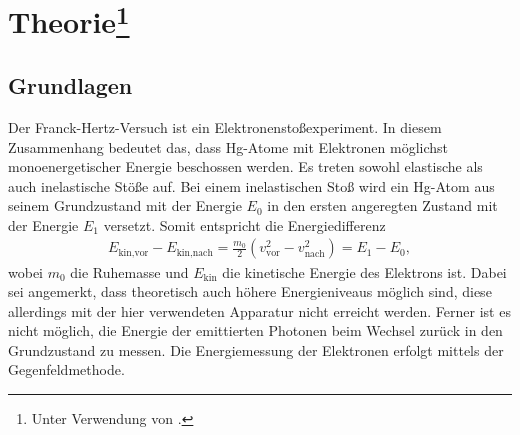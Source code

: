 \section[Theorie]{{Theorie\footnote[1]
{Unter Verwendung von \cite{man:v601}.}}}

\subsection{Grundlagen}
\label{sec:grundlagen}
Der Franck-Hertz-Versuch ist ein Elektronenstoßexperiment. 
In diesem Zusammenhang bedeutet das, dass Hg-Atome mit Elektronen möglichst monoenergetischer Energie beschossen werden.
Es treten sowohl elastische als auch inelastische Stöße auf.
Bei einem inelastischen Stoß wird ein Hg-Atom aus seinem Grundzustand mit der Energie $E_0$ in den ersten angeregten Zustand mit der Energie $E_1$ versetzt.
Somit entspricht die Energiedifferenz 
\begin{align}
    E_{\text{kin,vor}} - E_{\text{kin,nach}} = \frac{m_0}{2} \left(v^2_\text{vor} -v^2_\text{nach}\right) = E_1 - E_0,
    \label{eq:energiedifferenz}
\end{align}
wobei $m_0$ die Ruhemasse und $E_\text{kin}$ die kinetische Energie des Elektrons ist.
Dabei sei angemerkt, dass theoretisch auch höhere Energieniveaus möglich sind, diese allerdings mit der hier verwendeten Apparatur nicht erreicht werden.
Ferner ist es nicht möglich, die Energie der emittierten Photonen beim Wechsel zurück in den Grundzustand zu messen.
Die Energiemessung der Elektronen erfolgt mittels der Gegenfeldmethode.



